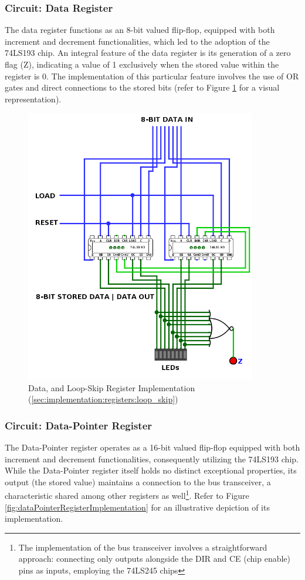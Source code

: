 \subsubsection{Circuit: Data Register}
The data register functions as an 8-bit valued flip-flop, equipped with both increment and decrement functionalities, which led to the adoption of the 74LS193 chip. An integral feature of the data register is its generation of a zero flag (Z), indicating a value of 1 exclusively when the stored value within the register is 0. The implementation of this particular feature involves the use of OR gates and direct connections to the stored bits (refer to Figure \ref{fig:dataRegisterImplementation} for a visual representation).


\begin{figure}[H]
	\centering
	\includegraphics[width=0.9\textwidth]{img/data_register_implementation}
	\caption{Data, and Loop-Skip Register Implementation (\ref{sec:implementation:registers:loop_skip})}
	\label{fig:dataRegisterImplementation}
\end{figure}


\subsubsection{Circuit: Data-Pointer Register}
The Data-Pointer register operates as a 16-bit valued flip-flop equipped with both increment and decrement functionalities, consequently utilizing the 74LS193 chip. While the Data-Pointer register itself holds no distinct exceptional properties, its output (the stored value) maintains a connection to the bus transceiver, a characteristic shared among other registers as well\footnote{The implementation of the bus transceiver involves a straightforward approach: connecting only outputs alongside the DIR and CE (chip enable) pins as inputs, employing the 74LS245 chips}. Refer to Figure \ref{fig:dataPointerRegisterImplementation} for an illustrative depiction of its implementation.


